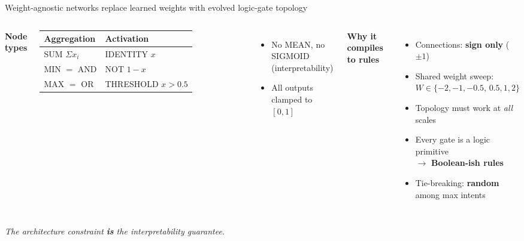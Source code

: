 \documentclass[10pt]{beamer}
\begin{document}
\begin{frame}{Weight-agnostic networks replace learned weights with evolved logic-gate topology}
  \begin{columns}[T]
      \textbf{Node types}\\[4pt]
      {\footnotesize
      \begin{tabular}{@{}ll@{}}
        \toprule
        \textbf{Aggregation} & \textbf{Activation} \\
        \midrule
        SUM $\Sigma x_i$ & IDENTITY $x$ \\
        MIN $=$ AND      & NOT $1{-}x$ \\
        MAX $=$ OR       & THRESHOLD $x{>}0.5$ \\
        \bottomrule
      \end{tabular}}
      \vspace{8pt}
      \begin{itemize}
        \item No MEAN, no SIGMOID (interpretability)
        \item All outputs clamped to $[0,1]$
      \end{itemize}
      \textbf{Why it compiles to rules}\\[4pt]
      \begin{itemize}
        \item Connections: \textbf{sign only} ($\pm 1$)
        \item Shared weight sweep:\\[-2pt]
              $W \in \{-2,-1,-0.5,\,0.5,1,2\}$
        \item Topology must work at \emph{all} scales
        \item Every gate is a logic primitive\\
              $\rightarrow$ \textbf{Boolean-ish rules}
        \item Tie-breaking: \textbf{random} among max intents
      \end{itemize}
  \end{columns}
  \vspace{6pt}
  \centering
  \small\emph{The architecture constraint \textbf{is} the interpretability guarantee.}
\end{frame}
\end{document}
